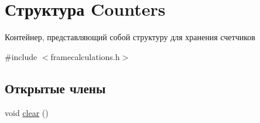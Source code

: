 \hypertarget{struct_counters}{}\section{Структура Counters}
\label{struct_counters}


Контейнер, представляющий собой структуру для хранения счетчиков  




{\ttfamily \#include $<$framecalculations.\+h$>$}

\subsection*{Открытые члены}
\begin{DoxyCompactItemize}
\item 
void \mbox{\hyperlink{struct_counters_ada46b45bb45210aad28a4ebbd23f98f8}{clear}} ()
\end{DoxyCompactItemize}
